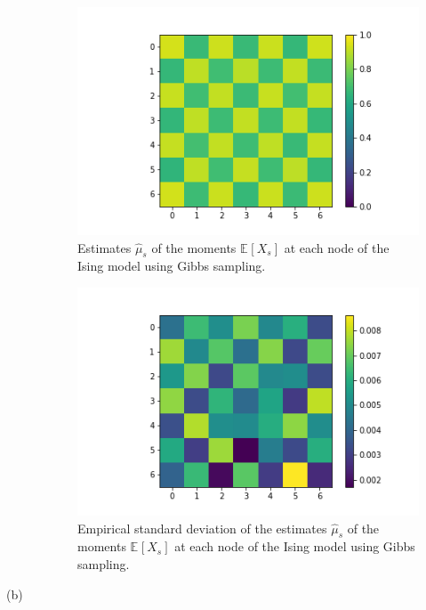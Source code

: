 \documentclass[11pt]{article}
\newcommand{\Expect}[2][]{\mathbb{E}_{#1}\!\left[#2 \right]}
\begin{document}
\begin{description}
\begin{figure}[htbp]
\begin{center}
\includegraphics[scale=0.6]{figures/mean_gibbs.png}
\caption{Estimates $\hat{\mu}_s$ of the moments $\Expect{X_s}$ at each node of the Ising model using Gibbs sampling.}
\label{fig:gibbs_mean}
\end{center}
\end{figure}

\begin{figure}[htbp]
\begin{center}
\includegraphics[scale=0.6]{figures/stddev_gibbs.png}
\caption{Empirical standard deviation of the estimates $\hat{\mu}_s$ of the moments $\Expect{X_s}$ at each node of the Ising model using Gibbs sampling.}
\label{fig:gibbs_std}
\end{center}
\end{figure}



\item [(b)]


\end{description}
\end{document}

